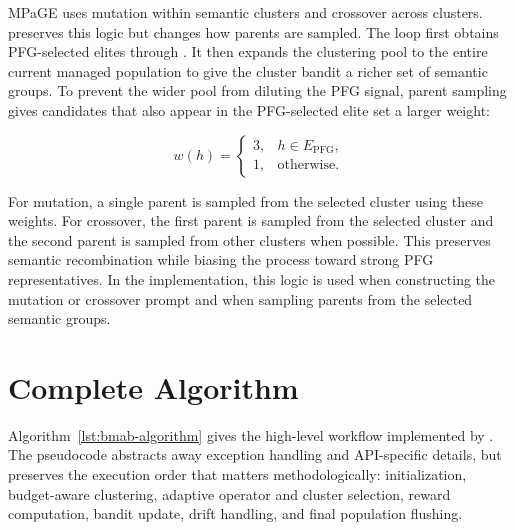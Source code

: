 \documentclass[../main.tex]{subfiles}
\begin{document}
MPaGE uses mutation within semantic clusters and crossover across clusters. \bmab{} preserves this logic but changes how parents are sampled. The loop first obtains PFG-selected elites through . It then expands the clustering pool to the entire current managed population to give the cluster bandit a richer set of semantic groups. To prevent the wider pool from diluting the PFG signal, parent sampling gives candidates that also appear in the PFG-selected elite set a larger weight:

\begin{equation}
  w(h)=
  \begin{cases}
    3, & h \in E_{\mathrm{PFG}},\\
    1, & \text{otherwise}.
  \end{cases}
\end{equation}

For mutation, a single parent is sampled from the selected cluster using these weights. For crossover, the first parent is sampled from the selected cluster and the second parent is sampled from other clusters when possible. This preserves semantic recombination while biasing the process toward strong PFG representatives. In the implementation, this logic is used when constructing the mutation or crossover prompt and when sampling parents from the selected semantic groups.

\section{Complete Algorithm}

Algorithm~\ref{lst:bmab-algorithm} gives the high-level workflow implemented by . The pseudocode abstracts away exception handling and API-specific details, but preserves the execution order that matters methodologically: initialization, budget-aware clustering, adaptive operator and cluster selection, reward computation, bandit update, drift handling, and final population flushing.
\end{document}
